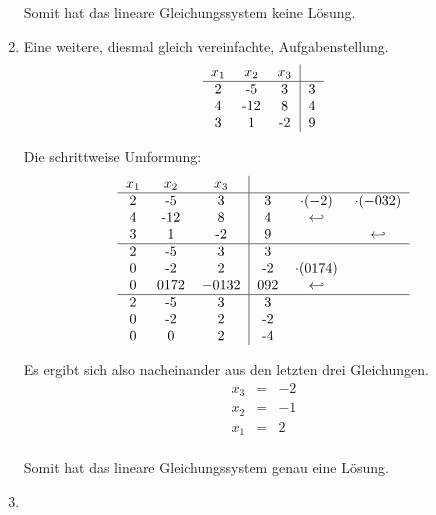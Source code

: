 \begin{enumerate}
					Somit hat das lineare Gleichungssystem keine L\"osung.
					
				\item
				
					Eine weitere, diesmal gleich vereinfachte, Aufgabenstellung.
					\[
						\begin{tabular} {ccc|c}
							$x_1$ & $x_2$ & $x_3$ &\\
							\hline
							2 & -5 & 3 & 3\\
							4 & -12 & 8 & 4\\
							3 & 1 & -2 & 9\\
						\end{tabular}
					\]
					
					Die schrittweise Umformung:
					\[
						\begin{tabular} {ccc|ccc}
							$x_1$ & $x_2$ & $x_3$ & & &\\
							\hline
							2 & -5 & 3 & 3 & $\cdot (-2)$ & $\cdot (-\frac{3} {2})$\\
							4 & -12 & 8 & 4 & $\hookleftarrow$ &\\
							3 & 1 & -2 & 9 & & $\hookleftarrow$\\
							\hline
							2 & -5 & 3 & 3 & &\\
							0 & -2 & 2 & -2 & $\cdot (\frac{17} {4})$ &\\
							0 & $\frac{17} {2}$ & $-\frac{13} {2}$ & $\frac{9} {2}$ & $\hookleftarrow$ &\\
							\hline
							2 & -5 & 3 & 3 & &\\
							0 & -2 & 2 & -2 & &\\
							0 & 0 & 2 & -4 & &\\
						\end{tabular}
					\]
					
					Es ergibt sich also nacheinander aus den letzten drei Gleichungen.
					\[
						\begin{array} {ccc}
							x_3 & = & -2\\
							x_2 & = & -1\\
							x_1 & = & 2\\
						\end{array}
					\]
					
					Somit hat das lineare Gleichungssystem genau eine L\"osung.

				\item
				

\end{enumerate}
